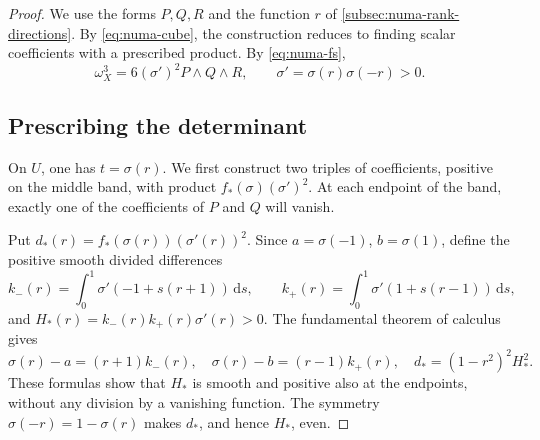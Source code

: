 \begin{proof}
We use the forms $P,Q,R$ and the function $r$ of \cref{subsec:numa-rank-directions}. By \eqref{eq:numa-cube}, the construction reduces to finding scalar coefficients with a prescribed product. By \eqref{eq:numa-fs},
\begin{equation}\label{eq:analytic-fs-cube}
 \omega_X^3=6(\sigma')^2P\wedge Q\wedge R,
 \qquad \sigma'=\sigma(r)\sigma(-r)>0.
\end{equation}

\subsection{Prescribing the determinant}
\label{subsec:analytic-prescribed-determinant}

On $U$, one has $t=\sigma(r)$. We first construct two triples of coefficients, positive on the middle band, with product $f_*(\sigma)(\sigma')^2$. At each endpoint of the band, exactly one of the coefficients of $P$ and $Q$ will vanish.

Put $d_*(r)=f_*(\sigma(r))(\sigma'(r))^2$.  Since
$a=\sigma(-1)$, $b=\sigma(1)$, define the positive smooth divided
differences
\[
 k_-(r)=\int_0^1\sigma'(-1+s(r+1))\,\mathrm{d}s,\qquad
 k_+(r)=\int_0^1\sigma'(1+s(r-1))\,\mathrm{d}s,
\]
and $H_*(r)=k_-(r)k_+(r)\sigma'(r)>0$.  The fundamental theorem of
calculus gives
\begin{equation}\label{uni-eq:prescribed-det}
 \sigma(r)-a=(r+1)k_-(r),\quad
 \sigma(r)-b=(r-1)k_+(r),\quad
 d_*=(1-r^2)^2H_*^2.
\end{equation}
These formulas show that $H_*$ is smooth and positive also at the endpoints,
without any division by a vanishing function.  The symmetry
$\sigma(-r)=1-\sigma(r)$ makes $d_*$, and hence $H_*$, even.


\end{proof}

